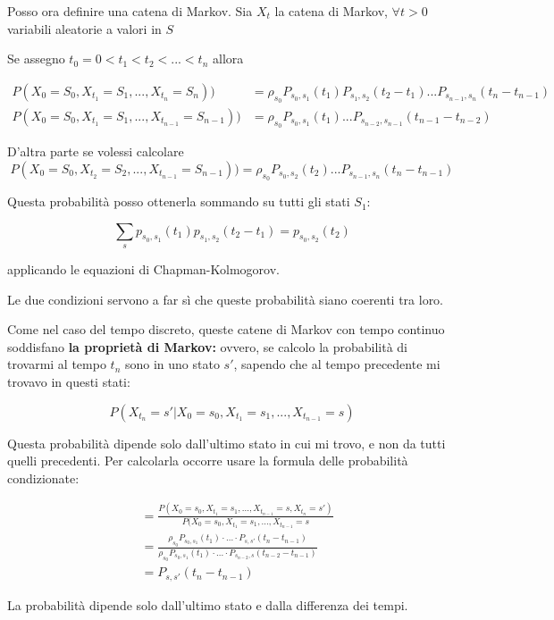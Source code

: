 \documentclass[a4paper,12pt]{book}
\begin{document}
Posso ora definire una catena di Markov. Sia $ X_t $ la catena di Markov, $ \forall t > 0 $ variabili aleatorie a valori in $ S $ %

Se assegno $ t_0 = 0 < t_1 < t_2 < ... < t_n $ allora

\begin{align*}
	P(X_0 = S_0, X_{t_1} = S_1, ..., X_{t_n} = S_n) ) & = \rho_{s_0} P_{s_0, s_1}(t_1) P_{s_1, s_2}(t_2 - t_1) ... P_{s_{n-1}, s_n} (t_n - t_{n-1}) \\
	P(X_0 = S_0, X_{t_1} = S_1, ..., X_{t_{n-1}} = S_{n-1})) & = \rho_{s_0} P_{s_0, s_1}(t_1) ... P_{s_{n-2} , s_{n-1}} (t_{n-1} - t_{n-2})
\end{align*}

D'altra parte se volessi calcolare
$$ P(X_0 = S_0, X_{t_2} = S_2, ..., X_{t_{n-1}} = S_{n-1})) = \rho_{s_0} P_{s_0, s_2}(t_2) ... P_{s_{n-1} , s_{n}} (t_{n} - t_{n-1}) $$

Questa probabilità posso ottenerla sommando su tutti gli stati $ S_1 $:

$$ \sum_s p_{s_0, s_1}(t_1) p_{s_1, s_2}(t_2 - t_1) = p_{s_0, s_2}(t_2) $$

applicando le equazioni di Chapman-Kolmogorov.

Le due condizioni servono a far sì che queste probabilità siano coerenti tra loro. 

Come nel caso del tempo discreto, queste catene di Markov con tempo continuo soddisfano \textbf{la proprietà di Markov:} ovvero, se calcolo la probabilità di trovarmi al tempo $ t_n $ sono in uno stato $ s' $, sapendo che al tempo precedente mi trovavo in questi stati:

$$ P(X_{t_n} = s' | X_0 = s_0, X_{t_1} = s_1, ..., X_{t_{n-1}} = s )  $$

Questa probabilità dipende solo dall'ultimo stato in cui mi trovo, e non da tutti quelli precedenti. Per calcolarla occorre usare la formula delle probabilità condizionate:

\begin{align*}
	& = \frac{P(X_0 = s_0, X_{t_1} = s_1, ..., X_{t_{n-1}} = s, X_{t_n} = s' )}{P(X_0 = s_0, X_{t_1} = s_1, ..., X_{t_{n-1}} = s} \\
	& = \frac{\rho_{s_0}P_{s_0, s_1}(t_1) \cdot ... \cdot P_{s,s'} (t_n - t_{n-1}) }{\rho_{s_0}P_{s_0, s_1}(t_1) \cdot ... \cdot P_{s_{n-2}, s}(t_{n-2} - t_{n-1})} \\
	& = P_{s,s'}(t_n - t_{n-1})
\end{align*}


La probabilità dipende solo dall'ultimo stato e dalla differenza dei tempi.
\end{document}
